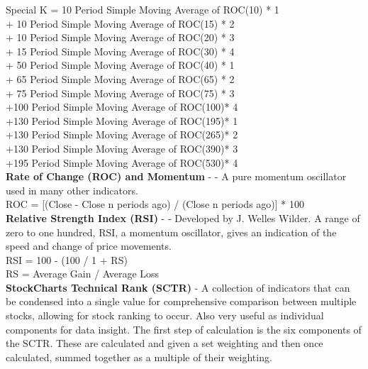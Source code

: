 \documentclass[12pt,a4paper]{article}
\begin{document}
\noindent
Special K = 10 Period Simple Moving Average of ROC(10) * 1 \\
            + 10 Period Simple Moving Average of ROC(15) * 2 \\
            + 10 Period Simple Moving Average of ROC(20) * 3 \\
            + 15 Period Simple Moving Average of ROC(30) * 4 \\
            + 50 Period Simple Moving Average of ROC(40) * 1 \\
            + 65 Period Simple Moving Average of ROC(65) * 2 \\
            + 75 Period Simple Moving Average of ROC(75) * 3 \\
            +100 Period Simple Moving Average of ROC(100)* 4 \\
            +130 Period Simple Moving Average of ROC(195)* 1 \\
            +130 Period Simple Moving Average of ROC(265)* 2 \\
            +130 Period Simple Moving Average of ROC(390)* 3 \\
            +195 Period Simple Moving Average of ROC(530)* 4 \\

\iffalse
[]
\fi

\noindent
\textbf{Rate of Change (ROC) and Momentum} - \cite{Murphy1999} - A pure momentum oscillator used in many other indicators.\\

\noindent
ROC = [(Close - Close n periods ago) / (Close n periods ago)] * 100 \\

\iffalse
[]
\fi

\noindent
\textbf{Relative Strength Index (RSI)} - \cite{Wilder1978} - Developed by J. Welles Wilder. A range of zero to one hundred, RSI, a momentum oscillator, gives an indication of the speed and change of price movements.\\

\noindent
RSI = 100 - (100 / 1 + RS) \\
RS = Average Gain / Average Loss\\

\iffalse
[]
\fi

\noindent
\textbf{StockCharts Technical Rank (SCTR)} - A collection of indicators that can be condensed into a single value for comprehensive comparison between multiple stocks, allowing for stock ranking to occur. Also very useful as individual components for data insight. The first step of calculation is the six components of the SCTR. These are calculated and given a set weighting and then once calculated, summed together as a multiple of their weighting. \\
\end{document}

